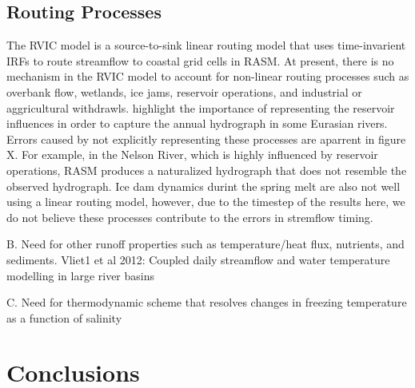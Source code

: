 \documentclass[ms, draft]{agutex}
\begin{document}
\begin{article}
\subsection{Routing Processes}
The RVIC model is a source-to-sink linear routing model that uses time-invarient IRFs to route streamflow to coastal grid cells in RASM.
At present, there is no mechanism in the RVIC model to account for non-linear routing processes such as overbank flow, wetlands, ice jams, reservoir operations, and industrial or aggricultural withdrawls.
\citet{Adam_2007} highlight the importance of representing the reservoir influences in order to capture the annual hydrograph in some Eurasian rivers.
Errors caused by not explicitly representing these processes are aparrent in figure X.
For example, in the Nelson River, which is highly influenced by reservoir operations, RASM produces a naturalized hydrograph that does not resemble the observed hydrograph.
Ice dam dynamics durint the spring melt are also not well using a linear routing model, however, due to the timestep of the results here, we do not believe these processes contribute to the errors in stremflow timing.

B.	Need for other runoff properties such as temperature/heat flux, nutrients, and sediments.
Vliet1 et al 2012: Coupled daily streamflow and water temperature modelling in large river basins

C.	Need for thermodynamic scheme that resolves changes in freezing temperature as a function of salinity

\section{Conclusions}




%
%
%
%
%
%
%


\end{article}
\end{document}
